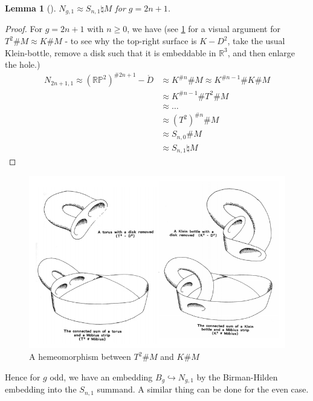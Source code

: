 \documentclass[reqno]{amsart}
\newtheorem{lemma}[theorem]{Lemma}
\theoremstyle{definition}
\theoremstyle{remark}
\begin{document}
\begin{lemma}[]\label{prop61}
    $N_{g,1} \approx S_{n,1} \natural M$ for
    $g = 2n+1$.
\end{lemma}

\begin{proof}

For $g = 2n+1$ with $n\ge 0$, we have
(see \ref{fig:N_3-1-jpg} for a visual argument for
$T^2 \# M \approx K \# M$ - 
to see why the top-right surface is $K - D^2$, take
the usual Klein-bottle, remove a disk such that
it is embeddable in $\mathbb{R}^{3}$, and
then enlarge the hole.)
\begin{align*}
N_{2n+1,1} \approx
\left( \mathbb{R}\mathbb{P}^2 \right)^{\# 2n+1} -
\mathring{D} 
&\approx K^{\# n} \# M
\approx K^{\# n-1} \# K \# M\\
&\approx K^{\# n-1} \# T^2 \# M\\
&\approx \ldots\\
&\approx \left( T^2 \right)^{\# n} \# M\\
&\approx S_{n,0} \# M\\
&\approx S_{n,1} \natural M
\end{align*}

\end{proof}


\begin{figure}[H]
    \centering
    \includegraphics[width=1\textwidth]{N_3,1.jpg}
    \caption{A hemeomorphism between 
    $T^2 \# M$ and $K \# M$}
    \label{fig:N_3-1-jpg}
\end{figure}





Hence for $g$ odd, we have an embedding
$B_{g} \hookrightarrow N_{g,1}$ by the Birman-Hilden
embedding into the $S_{n,1}$ summand. A similar thing
can be done for the even case.\\
\linebreak
\end{document}
